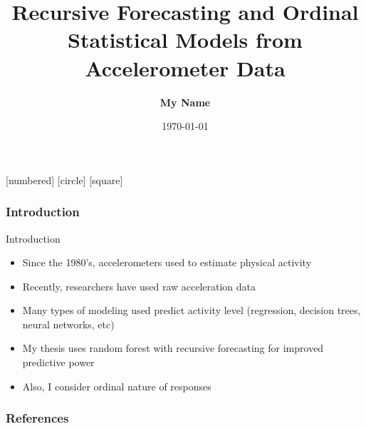 \documentclass[serif]{beamer}
\begin{document}
[numbered]
[circle]
[square]
\theoremstyle{definition}
\newtheorem*{exs}{Examples}
\newtheorem{ex}{Example}
\newtheorem*{exc}{Exercise}
\setlength{\parindent}{0pt}

\title{Recursive Forecasting and Ordinal Statistical Models from Accelerometer Data}
\author{\textbf{My Name}}
\date{\today}

{ %


\begin{frame}[plain]
\titlepage
\end{frame}
} %

\begin{frame}
\frametitle{Introduction}
\begin{block}{Introduction}
\begin{itemize}
\item Since the 1980’s, accelerometers used to estimate  physical activity
\item Recently, researchers have used raw acceleration data
\item Many types of modeling used predict activity level (regression, decision trees, neural networks, etc)
\item My thesis uses random forest with recursive forecasting for improved predictive power
\item Also, I consider ordinal nature of responses
\end{itemize}
\end{block}
\end{frame}

\begin{frame}[allowframebreaks]
        \frametitle{References}
        
        
\end{frame}


 
\end{document}
